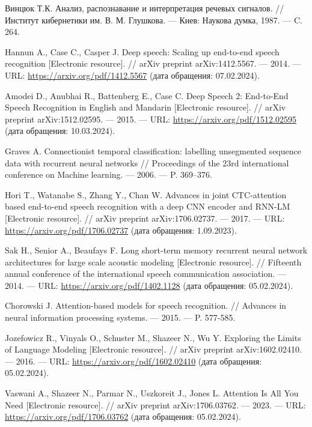 \begin{thebibliography}{}
            Винцюк Т.К. Анализ, распознавание и интерпретация речевых сигналов. // Институт кибернетики им. В. М. Глушкова. --- Киев: Наукова думка, 1987. --- C. 264.

            Hannun A., Case C., Casper J. Deep speech: Scaling up end-to-end speech recognition [Electronic resource]. // arXiv preprint arXiv:1412.5567. --- 2014. --- URL: \url{https://arxiv.org/pdf/1412.5567} (дата обращения: 07.02.2024). 

            Amodei D., Anubhai R., Battenberg E., Case C. Deep Speech 2: End-to-End Speech Recognition in English and Mandarin [Electronic resource]. // arXiv preprint arXiv:1512.02595. --- 2015. --- URL: \url{https://arxiv.org/pdf/1512.02595} (дата обращения: 10.03.2024). 

            Graves A. Connectionist temporal classification: labelling unsegmented sequence data with recurrent neural networks // Proceedings of the 23rd international conference on Machine learning. --- 2006. --- P. 369--376.

            Hori T., Watanabe S., Zhang Y., Chan W. Advances in joint CTC-attention based end-to-end speech recognition with a deep CNN encoder and RNN-LM [Electronic resource]. // arXiv preprint arXiv:1706.02737. --- 2017. --- URL: \url{https://arxiv.org/pdf/1706.02737} (дата обращения: 1.09.2023). 

            Sak H., Senior A., Beaufays F. Long short-term memory recurrent neural network architectures for large scale acoustic modeling [Electronic resource]. // Fifteenth annual conference of the international speech communication association. --- 2014. --- URL: \url{https://arxiv.org/pdf/1402.1128} (дата обращения: 05.02.2024).

            Chorowski J. Attention-based models for speech recognition. // Advances in neural information processing systems. --- 2015. --- P. 577-585.

            Jozefowicz R., Vinyals O., Schuster M., Shazeer N., Wu Y. Exploring the Limits of Language Modeling [Electronic resource]. // arXiv preprint arXiv:1602.02410. --- 2016. --- URL: \url{https://arxiv.org/pdf/1602.02410} (дата обращения: 05.02.2024).

            Vaswani A., Shazeer N., Parmar N., Uszkoreit J., Jones L. Attention Is All You Need [Electronic resource]. // arXiv preprint arXiv:1706.03762. --- 2023. --- URL: \url{https://arxiv.org/pdf/1706.03762} (дата обращения: 05.02.2024).

    \end{thebibliography}
\endgroup
